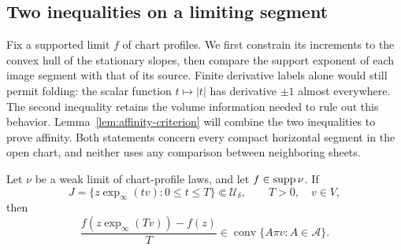 \subsection{Two inequalities on a limiting segment}

Fix a supported limit $f$ of chart profiles.  We first constrain
its increments to the convex hull of the stationary slopes, then
compare the support exponent of each image segment with that of its
source.  Finite derivative labels alone would still permit folding:
the scalar function $t\mapsto|t|$ has derivative $\pm1$ almost everywhere.
The second inequality retains the volume information needed to rule
out this behavior.  Lemma~\ref{lem:affinity-criterion} will combine
the two inequalities to prove affinity.
Both statements concern every compact horizontal segment in the
open chart, and neither uses any comparison between neighboring
sheets.

\begin{lemma}\label{lem:profile-convex-increments}
Let $\nu$ be a weak limit of chart-profile laws, and let
$f\in\operatorname{supp}\nu$.  If
\[
 J=\{z\exp_\infty(tv):0\le t\le T\}\Subset\mathcal U_\delta,
 \qquad T>0,\quad v\in V,
\]
then
\begin{equation}\label{eq:profile-convex-increments}
 \frac{f(z\exp_\infty(Tv))-f(z)}{T}
       \in\operatorname{conv}\{A\pi v:A\in\mathcal A\}.
\end{equation}
\end{lemma}

